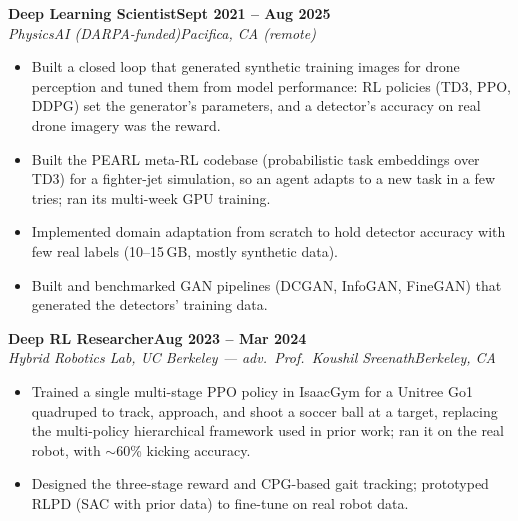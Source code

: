 \documentclass[10pt]{article}
\newcommand{\role}[4]{\textbf{#1}\hfill\textbf{#2}\\\textit{#3}\hfill\textit{#4}}
\begin{document}
\role{Deep Learning Scientist}{Sept 2021 -- Aug 2025}{PhysicsAI (DARPA-funded)}{Pacifica, CA (remote)}
\begin{itemize}
\item Built a closed loop that generated synthetic training images for drone perception and tuned them from model performance: RL policies (TD3, PPO, DDPG) set the generator's parameters, and a detector's accuracy on real drone imagery was the reward.
\item Built the PEARL meta-RL codebase (probabilistic task embeddings over TD3) for a fighter-jet simulation, so an agent adapts to a new task in a few tries; ran its multi-week GPU training.
\item Implemented domain adaptation from scratch to hold detector accuracy with few real labels (10--15\,GB, mostly synthetic data).
\item Built and benchmarked GAN pipelines (DCGAN, InfoGAN, FineGAN) that generated the detectors' training data.
\end{itemize}

\role{Deep RL Researcher}{Aug 2023 -- Mar 2024}{Hybrid Robotics Lab, UC Berkeley --- adv.\ Prof.\ Koushil Sreenath}{Berkeley, CA}
\begin{itemize}
\item Trained a single multi-stage PPO policy in IsaacGym for a Unitree Go1 quadruped to track, approach, and shoot a soccer ball at a target, replacing the multi-policy hierarchical framework used in prior work; ran it on the real robot, with $\sim$60\% kicking accuracy.
\item Designed the three-stage reward and CPG-based gait tracking; prototyped RLPD (SAC with prior data) to fine-tune on real robot data.
\end{itemize}
\end{document}
